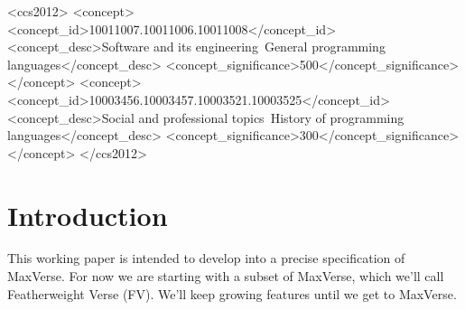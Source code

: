 \documentclass[acmsmall,review,anonymous,dvipsnames]{acmart}\settopmatter{printfolios=true,printccs=false,printacmref=false}
\begin{document}
\begin{CCSXML}
<ccs2012>
<concept>
<concept_id>10011007.10011006.10011008</concept_id>
<concept_desc>Software and its engineering~General programming languages</concept_desc>
<concept_significance>500</concept_significance>
</concept>
<concept>
<concept_id>10003456.10003457.10003521.10003525</concept_id>
<concept_desc>Social and professional topics~History of programming languages</concept_desc>
<concept_significance>300</concept_significance>
</concept>
</ccs2012>
\end{CCSXML}





\maketitle

\newif\ifunify
\unifyfalse %

\newif\ifmatch
\matchtrue

\section{Introduction}

This working paper is intended to develop into a precise specification of MaxVerse. For now we are starting
with a subset of MaxVerse, which we'll call Featherweight Verse (FV).  We'll keep growing features until
we get to MaxVerse.
\end{document}
